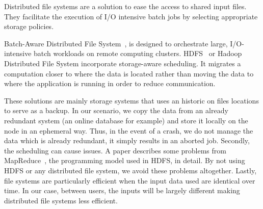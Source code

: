 \documentclass[conference,10pt]{IEEEtran}
\begin{document}
Distributed file systems are a solution to ease the access to 
shared input files. They facilitate the execution of I/O intensive batch
jobs by selecting appropriate storage policies.

Batch-Aware Distributed File System~\cite{Explicit_Control_in_a_Batch-Aware_Distributed_File_System},
is designed to orchestrate large, I/O-intensive batch workloads on remote computing clusters.
HDFS~\cite{hdfs} or Hadoop Distributed File System
incorporate storage-aware scheduling. 
It migrates a computation closer to where the data is
located rather than moving the data to where the application is running in order to reduce communication.

These solutions are mainly storage systems that uses an historic on files locations to serve as a backup.
In our scenario, we copy the data from an already redundant system (an online database for example)
and store it locally on the node in an ephemeral way.
Thus, in the event of a crash, we do not manage the data which is already redundant, it simply results in an aborted job.
Secondly, the scheduling can cause issues. A paper describes some problems from
MapReduce~\cite{issue_with_hdfs}, the programming model used in HDFS, in detail.
By not using HDFS or any distributed file system, we avoid these problems altogether. 
Lastly, file systems are particularly efficient when the input data used are identical over time.
In our case, between users, the inputs will be largely different making distributed file systems less efficient.
\end{document}
